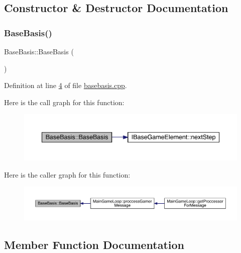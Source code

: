 \subsection{Constructor \& Destructor Documentation}
\mbox{\label{a00149_aa3c0b1cd0f29db8b63bb22dbfb78bbc5}} 
\subsubsection{\texorpdfstring{Base\+Basis()}{BaseBasis()}}
{\footnotesize\ttfamily Base\+Basis\+::\+Base\+Basis (\begin{DoxyParamCaption}{ }\end{DoxyParamCaption})}



Definition at line \hyperlink{a00026_source_l00004}{4} of file \hyperlink{a00026_source}{basebasis.\+cpp}.

Here is the call graph for this function\+:
\nopagebreak
\begin{figure}[H]
\begin{center}
\leavevmode
\includegraphics[width=350pt]{da/d1e/a00149_aa3c0b1cd0f29db8b63bb22dbfb78bbc5_cgraph}
\end{center}
\end{figure}
Here is the caller graph for this function\+:
\nopagebreak
\begin{figure}[H]
\begin{center}
\leavevmode
\includegraphics[width=350pt]{da/d1e/a00149_aa3c0b1cd0f29db8b63bb22dbfb78bbc5_icgraph}
\end{center}
\end{figure}


\subsection{Member Function Documentation}
\mbox{\label{a00149_aaf8b691c26fbbda7878c22dfda32ebe4}} 
